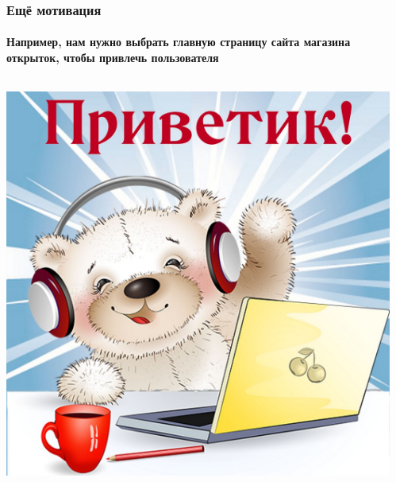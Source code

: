 \documentclass[fullscreen=true, bookmarks=true, hyperref={pdfencoding=unicode}]{beamer}
\begin{document}
\begin{frame}
  \frametitle{Ещё мотивация}
  \framesubtitle{Например, нам нужно выбрать главную страницу сайта магазина открыток, чтобы привлечь пользователя}

  \begin{columns}
      \begin{column}{.5\paperwidth}
        \begin{center}
          \includegraphics[keepaspectratio,
                           height=.5\paperheight]{hi-1.jpg}
        \end{center}
      \end{column}
      \begin{column}{.5\paperwidth}
        \begin{center}

\end{center}
\end{column}
\end{columns}
\end{frame}
\end{document}
